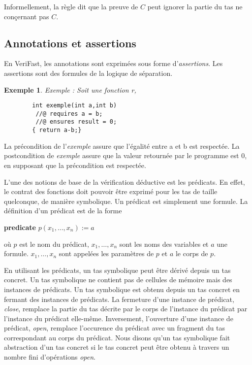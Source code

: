 \documentclass[11pt,openany]{article}
\newcommand{\verifast}{VeriFast}
\newtheorem{exemple}{Exemple}
\begin{document}
		Informellement, la r\`egle dit que la preuve de $C$ peut ignorer la partie du tas ne con\c{c}ernant pas $C$.
		
	\subsection{Annotations et assertions}
		 En \verifast, les annotations sont exprim\'ees sous forme d'\textit{assertions}. Les assertions sont des formules de la logique de s\'eparation.
		 
		\begin{exemple}
		Exemple : Soit une fonction r,
		\begin{lstlisting}
		int exemple(int a,int b)
		 //@ requires a = b;
		 //@ ensures result = 0;
		{ return a-b;}
		\end{lstlisting}
		\end{exemple}
		
	
		La pr\'econdition de l'\textit{exemple} assure que l'\'egalit\'e entre a et b est respect\'ee. La postcondition de \textit{exemple} assure que la valeur retourn\'ee par le programme est 0, en supposant que la pr\'econdition est respect\'ee. 
	
	L'une des notions de base de la v\'erification d\'eductive est les pr\'edicats. En effet, le contrat des fonctions doit pouvoir \^etre exprim\'e pour les tas de taille quelconque, de mani\`ere symbolique. Un pr\'edicat est simplement une formule. La d\'efinition d'un pr\'edicat est de la forme
	\begin{center}
	
		\textbf{predicate} $p(x_1,\ldots,x_n):=a$

	\end{center}
o\`u $p$ est le nom du pr\'edicat, $x_1,\ldots,x_n$ sont les noms des variables et $a$ une formule. $x_1,\ldots,x_n$ sont appel\'ees les param\`etres de $p$ et $a$ le corps de $p$.

	En utilisant les pr\'edicats, un tas symbolique peut \^etre d\'eriv\'e depuis un tas concret. Un tas symbolique ne contient pas de cellules de m\'emoire mais des instances de pr\'edicats. Un tas symbolique est obtenu depuis un tas concret en fermant des instances de pr\'edicats. La fermeture d'une instance de pr\'edicat, \textit{close}, remplace la partie du tas d\'ecrite par le corps de l'instance du pr\'edicat par l'instance du pr\'edicat elle-m\^eme. Inversement, l'ouverture d'une instance de pr\'edicat, \textit{open}, remplace l'occurence du pr\'edicat avec un fragment du tas correspondant au corps du pr\'edicat. Nous disons qu'un tas symbolique fait abstraction d'un tas concret si le tas concret peut \^etre obtenu \`a travers un nombre fini d'op\'erations \textit{open}.
	
\end{document}

